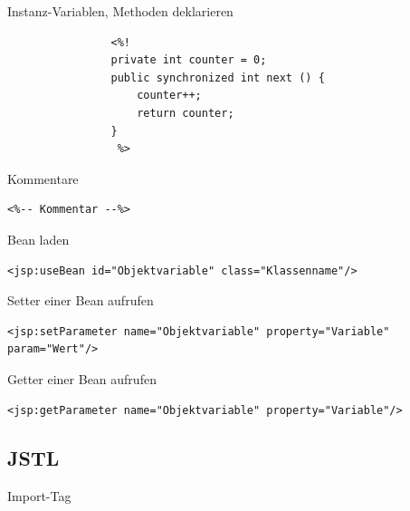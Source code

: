 \documentclass[11pt]{article}
\begin{document}
			Instanz-Variablen, Methoden deklarieren
			
			\begin{lstlisting}
				<%! 
				private int counter = 0;
				public synchronized int next () {			
					counter++;
					return counter; 
				}
				 %>
			\end{lstlisting}
			
			Kommentare
			
			\begin{lstlisting}
<%-- Kommentar --%>
			\end{lstlisting}
			
			Bean laden
			
			\begin{lstlisting}
<jsp:useBean id="Objektvariable" class="Klassenname"/>
			\end{lstlisting}			
			
			Setter einer Bean aufrufen
			
			\begin{lstlisting}
<jsp:setParameter name="Objektvariable" property="Variable" param="Wert"/>			
			\end{lstlisting}
			
			Getter einer Bean aufrufen
			
			\begin{lstlisting}
<jsp:getParameter name="Objektvariable" property="Variable"/>
			\end{lstlisting}
			
			
		\subsection{JSTL}	
			
			Import-Tag
			
\end{document}
